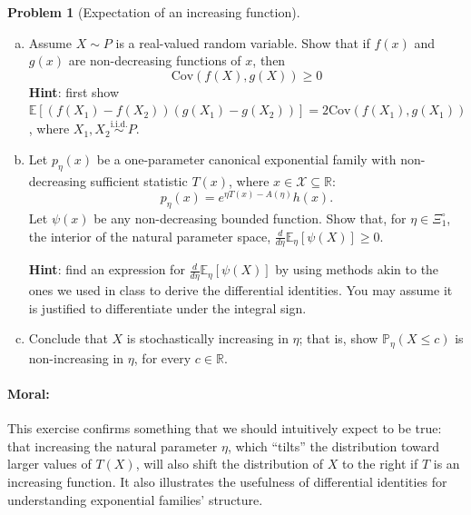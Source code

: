 \documentclass{article}
\newcommand{\cX}{\mathcal{X}}
\newcommand{\EE}{\mathbb{E}}
\newcommand{\PP}{\mathbb{P}}
\newcommand{\RR}{\mathbb{R}}
\newcommand{\simiid}{\overset{\text{i.i.d.}}{\sim}}
\theoremstyle{definition}
\newtheorem{problem}{Problem}
\begin{document}
\begin{problem}[Expectation of an increasing function]
\label{prob:expectation-increasing}
\begin{enumerate}[(a)]
\item Assume $X\sim P$ is a real-valued random variable. Show that if $f(x)$ and $g(x)$ are non-decreasing functions of $x$, then 
\[
\text{Cov}(f(X),g(X)) \geq 0
\]
{\bf Hint}: first show $\EE\left[(f(X_1)-f(X_2))(g(X_1)-g(X_2))\right] = 2\text{Cov}(f(X_1),g(X_1))$, where $X_1,X_2\simiid P$.



\item Let $p_\eta(x)$ be a one-parameter canonical exponential family with non-decreasing sufficient statistic $T(x)$, where $x\in\cX\subseteq \RR$:
\[
p_\eta(x) = e^{\eta T(x) - A(\eta)}h(x).
\]
Let $\psi(x)$ be any non-decreasing bounded function. Show that, for $\eta\in\Xi_1^\circ$, the interior of the natural parameter space, $\frac{d}{d \eta}\EE_{\eta}[\psi(X)] \geq 0$.

{\bf Hint}: find an expression for $\frac{d}{d \eta} \EE_{\eta}[\psi(X)]$ by using methods akin to the ones we used in class to derive the differential identities. You may assume it is justified to differentiate under the integral sign.



\item Conclude that $X$ is stochastically increasing in $\eta$; that is, show $\PP_\eta(X \leq c)$ is non-increasing in $\eta$, for every $c \in \RR$.



\end{enumerate}

\paragraph{Moral:} This exercise confirms something that we should intuitively expect to be true: that increasing the natural parameter $\eta$, which ``tilts'' the distribution toward larger values of $T(X)$, will also shift the distribution of $X$ to the right if $T$ is an increasing function. It also illustrates the usefulness of differential identities for understanding exponential families' structure.
\end{problem}
\end{document}
